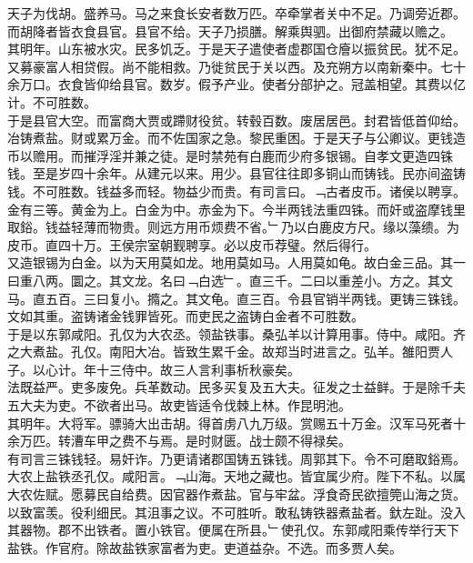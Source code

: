 \documentclass{zhvt-classic}
\begin{document}
\hspace*{2em}天子为伐胡。盛养马。马之来食长安者数万匹。卒牵掌者关中不足。乃调旁近郡。而胡降者皆衣食县官。县官不给。天子乃损膳。解乘舆驷。出御府禁藏以赡之。\\
\hspace*{2em}其明年。山东被水灾。民多饥乏。于是天子遣使者虚郡国仓廥以振贫民。犹不足。又募豪富人相贷假。尚不能相救。乃徙贫民于关以西。及充朔方以南新秦中。七十余万口。衣食皆仰给县官。数岁。假予产业。使者分部护之。冠盖相望。其费以亿计。不可胜数。\\
\hspace*{2em}于是县官大空。而富商大贾或蹛财役贫。转毂百数。废居居邑。封君皆低首仰给。冶铸煮盐。财或累万金。而不佐国家之急。黎民重困。于是天子与公卿议。更钱造币以赡用。而摧浮淫并兼之徒。是时禁苑有白鹿而少府多银锡。自孝文更造四铢钱。至是岁四十余年。从建元以来。用少。县官往往即多铜山而铸钱。民亦间盗铸钱。不可胜数。钱益多而轻。物益少而贵。有司言曰。﹁古者皮币。诸侯以聘享。金有三等。黄金为上。白金为中。赤金为下。今半两钱法重四铢。而奸或盗摩钱里取鋊。钱益轻薄而物贵。则远方用币烦费不省。﹂乃以白鹿皮方尺。缘以藻缋。为皮币。直四十万。王侯宗室朝觐聘享。必以皮币荐璧。然后得行。\\
\hspace*{2em}又造银锡为白金。以为天用莫如龙。地用莫如马。人用莫如龟。故白金三品。其一曰重八两。圜之。其文龙。名曰﹁白选﹂。直三千。二曰以重差小。方之。其文马。直五百。三曰复小。撱之。其文龟。直三百。令县官销半两钱。更铸三铢钱。文如其重。盗铸诸金钱罪皆死。而吏民之盗铸白金者不可胜数。\\
\hspace*{2em}于是以东郭咸阳。孔仅为大农丞。领盐铁事。桑弘羊以计算用事。侍中。咸阳。齐之大煮盐。孔仅。南阳大冶。皆致生累千金。故郑当时进言之。弘羊。雒阳贾人子。以心计。年十三侍中。故三人言利事析秋豪矣。\\
\hspace*{2em}法既益严。吏多废免。兵革数动。民多买复及五大夫。征发之士益鲜。于是除千夫五大夫为吏。不欲者出马。故吏皆适令伐棘上林。作昆明池。\\
\hspace*{2em}其明年。大将军。骠骑大出击胡。得首虏八九万级。赏赐五十万金。汉军马死者十余万匹。转漕车甲之费不与焉。是时财匮。战士颇不得禄矣。\\
\hspace*{2em}有司言三铢钱轻。易奸诈。乃更请诸郡国铸五铢钱。周郭其下。令不可磨取鋊焉。\\
\hspace*{2em}大农上盐铁丞孔仅。咸阳言。﹁山海。天地之藏也。皆宜属少府。陛下不私。以属大农佐赋。愿募民自给费。因官器作煮盐。官与牢盆。浮食奇民欲擅筦山海之货。以致富羡。役利细民。其沮事之议。不可胜听。敢私铸铁器煮盐者。釱左趾。没入其器物。郡不出铁者。置小铁官。便属在所县。﹂使孔仅。东郭咸阳乘传举行天下盐铁。作官府。除故盐铁家富者为吏。吏道益杂。不选。而多贾人矣。\\
\end{document}
